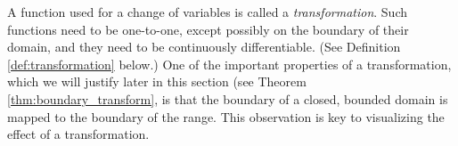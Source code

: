 


\enlargethispage{2\baselineskip}

A function used for a change of variables is called a \emph{transformation}. Such functions need to be one-to-one, except possibly on the boundary of their domain, and they need to be continuously differentiable. (See Definition \ref{def:transformation} below.) One of the important properties of a transformation, which we will justify later in this section (see Theorem \ref{thm:boundary_transform}, is that the boundary of a closed, bounded domain is mapped to the boundary of the range. This observation is key to visualizing the effect of a transformation.\\

